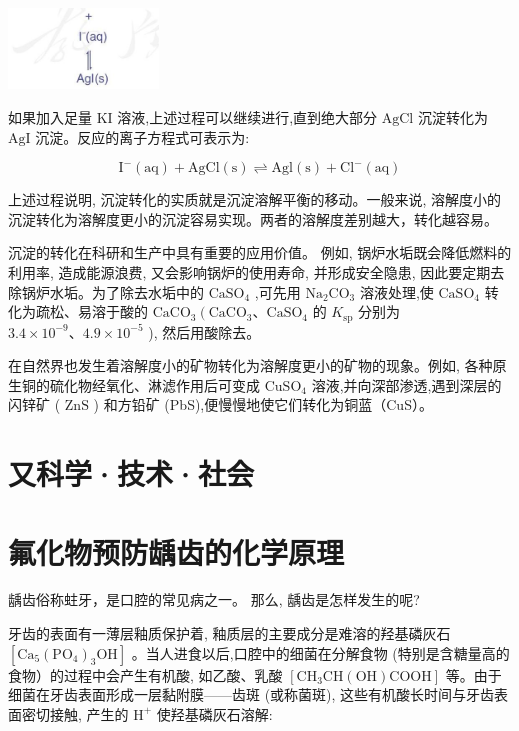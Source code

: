\documentclass[10pt]{article}
\begin{document}
\begin{center}
\includegraphics[max width=0.3\textwidth]{images/0190da9d-8bfd-732f-bc2c-0b21d0f13b91_89_557171.jpg}
\end{center}

如果加入足量 \(\mathrm{{KI}}\) 溶液,上述过程可以继续进行,直到绝大部分 \(\mathrm{{AgCl}}\) 沉淀转化为 \(\mathrm{{AgI}}\) 沉淀。反应的离子方程式可表示为:

\[
{\mathrm{I}}^{ - }\left( \mathrm{{aq}}\right) + \mathrm{{AgCl}}\left( \mathrm{s}\right) \rightleftharpoons \mathrm{{Agl}}\left( \mathrm{s}\right) + {\mathrm{{Cl}}}^{ - }\left( \mathrm{{aq}}\right)
\]

上述过程说明, 沉淀转化的实质就是沉淀溶解平衡的移动。一般来说, 溶解度小的沉淀转化为溶解度更小的沉淀容易实现。两者的溶解度差别越大，转化越容易。

沉淀的转化在科研和生产中具有重要的应用价值。 例如, 锅炉水垢既会降低燃料的利用率, 造成能源浪费, 又会影响锅炉的使用寿命, 并形成安全隐患, 因此要定期去除锅炉水垢。为了除去水垢中的 \({\mathrm{{CaSO}}}_{4}\) ,可先用 \({\mathrm{{Na}}}_{2}{\mathrm{{CO}}}_{3}\) 溶液处理,使 \({\mathrm{{CaSO}}}_{4}\) 转化为疏松、易溶于酸的 \({\mathrm{{CaCO}}}_{3}\left( {{\mathrm{{CaCO}}}_{3}\text{、}{\mathrm{{CaSO}}}_{4}}\right.\) 的 \({K}_{\mathrm{{sp}}}\) 分别为 \({3.4} \times {10}^{-9}\text{、}{4.9} \times {10}^{-5}\) ), 然后用酸除去。

在自然界也发生着溶解度小的矿物转化为溶解度更小的矿物的现象。例如, 各种原生铜的硫化物经氧化、淋滤作用后可变成 \({\mathrm{{CuSO}}}_{4}\) 溶液,并向深部渗透,遇到深层的闪锌矿 ( \(\mathrm{{ZnS}}\) ) 和方铅矿 (PbS),便慢慢地使它们转化为铜蓝（CuS）。

\section*{又科学·技术·社会}

\section*{氟化物预防龋齿的化学原理}

龋齿俗称蛀牙，是口腔的常见病之一。 那么, 龋齿是怎样发生的呢?

牙齿的表面有一薄层釉质保护着, 釉质层的主要成分是难溶的羟基磷灰石 \(\left\lbrack {{\mathrm{{Ca}}}_{5}{\left( {\mathrm{{PO}}}_{4}\right) }_{3}\mathrm{{OH}}}\right\rbrack\) 。当人进食以后,口腔中的细菌在分解食物 (特别是含糖量高的食物）的过程中会产生有机酸, 如乙酸、乳酸 \(\left\lbrack {{\mathrm{{CH}}}_{3}\mathrm{{CH}}\left( \mathrm{{OH}}\right) \mathrm{{COOH}}}\right\rbrack\) 等。由于细菌在牙齿表面形成一层黏附膜——齿斑 (或称菌斑), 这些有机酸长时间与牙齿表面密切接触, 产生的 \({\mathrm{H}}^{ + }\) 使羟基磷灰石溶解:
\end{document}
